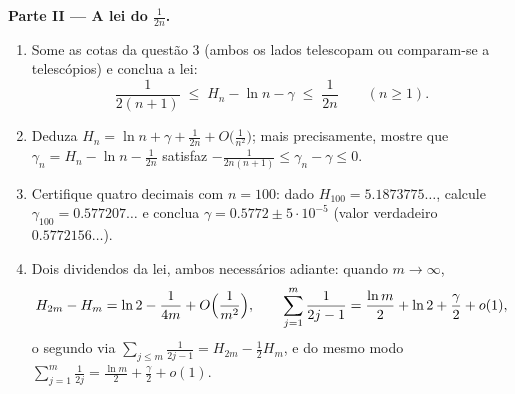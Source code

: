 \begin{problem}[{Problema de fim de semana --- $H_n = \ln n + \gamma +
\frac{1}{2n} + O(n^{-2})$, e rearranjar $1 - \frac12 +
\frac13 - \dots$ para $\frac{\ln 2}{2}$}]
\medskip
\noindent\textbf{Parte II --- A lei do $\frac{1}{2n}$.}
\begin{enumerate}[resume]
  \item Some as cotas da questão 3 (ambos os lados telescopam ou
        comparam-se a telescópios) e conclua a lei:
        \[
        \frac{1}{2(n+1)} \;\leq\; H_n - \ln n - \gamma \;\leq\;
        \frac{1}{2n} \qquad (n \geq 1).
        \]
  \item Deduza $H_n = \ln n + \gamma + \frac{1}{2n} +
        O\bigl(\frac{1}{n^2}\bigr)$; mais precisamente, mostre que
        $\gamma_n = H_n - \ln n - \frac{1}{2n}$ satisfaz
        $-\frac{1}{2n(n+1)} \leq \gamma_n - \gamma \leq 0$.
  \item Certifique quatro decimais com $n = 100$: dado $H_{100} =
        5.1873775\dots$,
        calcule $\gamma_{100} = 0.577207\dots$
        e conclua $\gamma = 0.5772 \pm 5\cdot10^{-5}$ (valor
        verdadeiro $0.5772156\dots$).
  \item Dois dividendos da lei, ambos necessários adiante: quando
        $m \to
        \infty$,
        \[
        H_{2m} - H_m = \ln 2 - \frac{1}{4m} +
        O\Bigl(\frac{1}{m^2}\Bigr),
        \qquad
        \sum_{j=1}^{m} \frac{1}{2j-1} = \frac{\ln m}{2} + \ln 2
        + \frac\gamma2 + o(1) ,
        \]
        o segundo via $\sum_{j \leq m} \frac{1}{2j-1} = H_{2m}
        - \frac12 H_m$, e do mesmo modo $\sum_{j=1}^{m}
        \frac{1}{2j} = \frac{\ln m}{2} + \frac\gamma2 + o(1)$.
\end{enumerate}


\end{problem}
